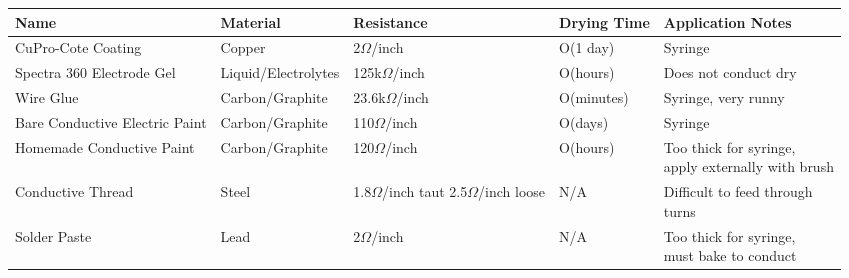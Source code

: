 \begin{table*}[t]
\begin{tabular}{ l || l | p{3cm} | l | p{4cm} }
  \hline
  Name & Material & Resistance & Drying Time & Application Notes\\ \hline
  CuPro-Cote Coating & Copper & 2$\Omega$/inch & O(1 day) & Syringe \\ \hline
  Spectra 360 Electrode Gel & Liquid/Electrolytes & 125k$\Omega$/inch & O(hours) & Does not conduct dry \\ \hline
  Wire Glue & Carbon/Graphite &  23.6k$\Omega$/inch & O(minutes) & Syringe, very runny \\ \hline
  Bare Conductive Electric Paint & Carbon/Graphite & 110$\Omega$/inch & O(days) & Syringe \\ \hline
  Homemade Conductive Paint & Carbon/Graphite & 120$\Omega$/inch & O(hours) & \parbox{4cm}{Too thick for syringe,\\ apply externally with brush} \\ \hline
  Conductive Thread & Steel & \parbox{3cm}{1.8$\Omega$/inch taut \\ 2.5$\Omega$/inch loose} & N/A & \parbox{4cm}{Difficult to feed through\\turns} \\ \hline
  Solder Paste & Lead & 2$\Omega$/inch & N/A & \parbox{4cm}{Too thick for syringe,\\ must bake to conduct} \\ \hline
\end{tabular}
\end{table*}